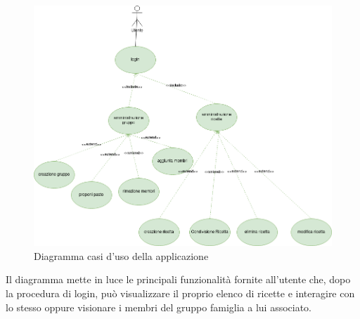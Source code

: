 \begin{figure}[H]
    \centering
 \includegraphics[scale=0.5]{resources/diagramma_casi_uso.drawio.png}
   \caption{Diagramma casi d'uso della applicazione}
\end{figure}
Il diagramma mette in luce le principali funzionalità fornite all'utente che, dopo la procedura di login, può visualizzare il proprio elenco di ricette e interagire con lo stesso  oppure visionare i membri del gruppo famiglia a lui associato.